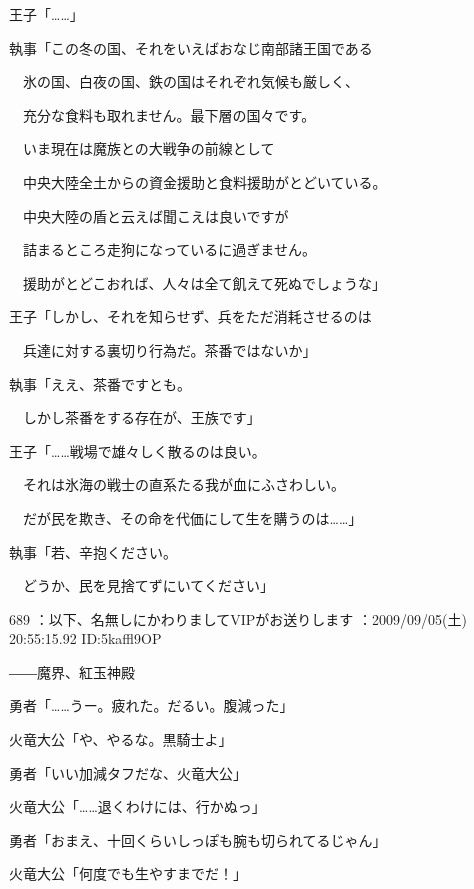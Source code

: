 \documentclass[a4j,twocolumn]{tarticle}
\begin{document}
王子「……」 



執事「この冬の国、それをいえばおなじ南部諸王国である\par{} 
　氷の国、白夜の国、鉄の国はそれぞれ気候も厳しく、\par{} 
　充分な食料も取れません。最下層の国々です。\par{} 
　いま現在は魔族との大戦争の前線として\par{} 
　中央大陸全土からの資金援助と食料援助がとどいている。\par{} 
　中央大陸の盾と云えば聞こえは良いですが\par{} 
　詰まるところ走狗になっているに過ぎません。\par{} 
　援助がとどこおれば、人々は全て飢えて死ぬでしょうな」 



王子「しかし、それを知らせず、兵をただ消耗させるのは\par{} 
　兵達に対する裏切り行為だ。茶番ではないか」 



執事「ええ、茶番ですとも。\par{} 
　しかし茶番をする存在が、王族です」 



王子「……戦場で雄々しく散るのは良い。\par{} 
　それは氷海の戦士の直系たる我が血にふさわしい。\par{} 
　だが民を欺き、その命を代価にして生を購うのは……」 



執事「若、辛抱ください。\par{} 
　どうか、民を見捨てずにいてください」 

	
    
    

689 ：以下、名無しにかわりましてVIPがお送りします ：2009/09/05(土) 20:55:15.92 ID:5kaffl9OP 


――魔界、紅玉神殿 



勇者「……うー。疲れた。だるい。腹減った」\par{} 
火竜大公「や、やるな。黒騎士よ」 



勇者「いい加減タフだな、火竜大公」\par{} 
火竜大公「……退くわけには、行かぬっ」 



勇者「おまえ、十回くらいしっぽも腕も切られてるじゃん」\par{} 
火竜大公「何度でも生やすまでだ！」 
\end{document}

